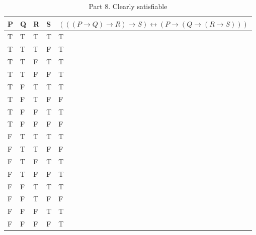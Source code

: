 \documentclass[10.5pt]{article}
\newenvironment{solution}[2][Solution]{ \begin{trivlist}
\item[\hskip \labelsep {\bfseries #1}]}{\end{trivlist}}
\begin{document}
\begin{solution}{2}
\pagebreak

\begin{table}[!h]
\centering
\caption{Part 8. Clearly satisfiable}
\label{my-label}
\begin{tabular}{|l|l|l|l|l|}
\hline
P & Q & R & S & $(((P \rightarrow Q) \rightarrow R) \rightarrow S) \leftrightarrow (P \rightarrow (Q \rightarrow (R \rightarrow S)))$ \\ \hline
T & T & T & T & T \\ \hline
T & T & T & F & T \\ \hline
T & T & F & T & T \\ \hline
T & T & F & F & T \\ \hline
T & F & T & T & T \\ \hline
T & F & T & F & F \\ \hline
T & F & F & T & T \\ \hline
T & F & F & F & F \\ \hline
F & T & T & T & T \\ \hline
F & T & T & F & F \\ \hline
F & T & F & T & T \\ \hline
F & T & F & F & T \\ \hline
F & F & T & T & T \\ \hline
F & F & T & F & F \\ \hline
F & F & F & T & T \\ \hline
F & F & F & F & T \\ \hline
\end{tabular}
\end{table}


\end{solution}
\end{document}
